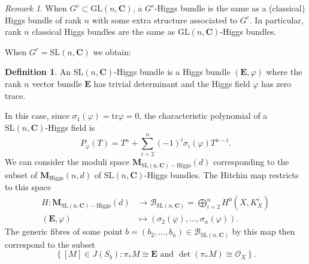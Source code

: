 \documentclass[12pt,a4paper]{book}
\theoremstyle{definition} \newtheorem{defn}[thm]{Definition}
\theoremstyle{definition} \newtheorem{ejemplo}[thm]{Example}
\theoremstyle{remark} \newtheorem{rem}[thm]{Remark}
\def\OO{\mathscr{O}}
\def\BB{\mathscr{B}}
\def\CC{\mathbf{C}}
\def\tr{\mathrm{tr}}
\def\SL{\mathrm{SL}}
\def\Hig{\mathbf{M}_{\mathrm{Higgs}}}
\def\SLHig{\mathbf{M}_{\mathrm{\SL(n,\CC)-Higgs}}}
\newcommand{\ve}[1]{\mathbf{#1}}
\begin{document}
\begin{rem}
  When $G^c\subset \mathrm{GL}(n,\CC)$, a $G^c$-Higgs bundle is the same as a (classical) Higgs bundle of rank $n$ with some extra structure associated to $G^c$. In particular, rank $n$ classical Higgs bundles are the same as $\mathrm{GL}(n,\CC)$-Higgs bundles.
\end{rem}

When $G^c=\SL(n,\CC)$ we obtain:
\begin{defn}
  An $\SL(n,\CC)$-Higgs bundle is a Higgs bundle $(\ve{E},\varphi)$ where the rank $n$ vector bundle $\ve{E}$ has trivial determinant and the Higgs field $\varphi$ has zero trace.
\end{defn}

In this case, since $\sigma_1(\varphi)=\tr \varphi=0$, the characteristic polynomial of a $\SL(n,\CC)$-Higgs field is
\begin{equation*}
  P_\varphi(T)=T^n + \sum_{i=2}^n (-1)^i\sigma_i(\varphi) T^{n-i}.
\end{equation*}
We can consider the moduli space $\SLHig(d)$ corresponding to the subset of $\Hig(n,d)$ of $\SL(n,\CC)$-Higgs bundles. The Hitchin map restricts to this space
\begin{align*}
  H :\SLHig(d)&\longrightarrow \BB_{\SL(n,\CC)}=\bigoplus_{i=2}^n H^0(X,K_X^i)\\ 
  (\ve{E},\varphi) &\longmapsto (\sigma_2(\varphi),\dots,\sigma_n(\varphi)). 
  \end{align*}
  The generic fibres of some point $b=(b_2,\dots,b_n)\in \BB_{\SL(n,\CC)}$ by this map then correspond to the subset
  \begin{equation*}
    \left\{ [M] \in J(S_b) : \pi_*M \cong \ve{E} \text{ and } \det(\pi_*M)\cong\OO_X  \right\}  . 
  \end{equation*}
\end{document}
